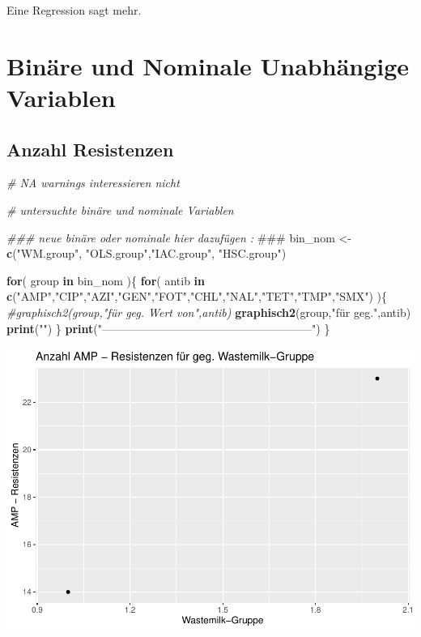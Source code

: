 \documentclass[
]{article}
\newenvironment{Shaded}{\begin{snugshade}}{\end{snugshade}}
\newcommand{\AlertTok}[1]{\textcolor[rgb]{0.94,0.16,0.16}{#1}}
\newcommand{\CommentTok}[1]{\textcolor[rgb]{0.56,0.35,0.01}{\textit{#1}}}
\newcommand{\ControlFlowTok}[1]{\textcolor[rgb]{0.13,0.29,0.53}{\textbf{#1}}}
\newcommand{\KeywordTok}[1]{\textcolor[rgb]{0.13,0.29,0.53}{\textbf{#1}}}
\newcommand{\NormalTok}[1]{#1}
\newcommand{\StringTok}[1]{\textcolor[rgb]{0.31,0.60,0.02}{#1}}
\begin{document}
Eine Regression sagt mehr.

\hypertarget{binuxe4re-und-nominale-unabhuxe4ngige-variablen}{%
\section{Binäre und Nominale Unabhängige
Variablen}\label{binuxe4re-und-nominale-unabhuxe4ngige-variablen}}

\hypertarget{anzahl-resistenzen}{%
\subsection{Anzahl Resistenzen}\label{anzahl-resistenzen}}

\begin{Shaded}
\begin{Highlighting}[]
\CommentTok{# NA warnings interessieren nicht}

\CommentTok{# untersuchte binäre und nominale Variablen }

\CommentTok{### neue binäre oder nominale hier dazufügen : }\AlertTok{###}
\NormalTok{bin_nom <-}\StringTok{ }\KeywordTok{c}\NormalTok{(}\StringTok{"WM.group"}\NormalTok{, }\StringTok{"OLS.group"}\NormalTok{,}\StringTok{"IAC.group"}\NormalTok{,   }\StringTok{"HSC.group"}\NormalTok{)       }

\ControlFlowTok{for}\NormalTok{( group }\ControlFlowTok{in}\NormalTok{ bin_nom )\{}
  \ControlFlowTok{for}\NormalTok{( antib }\ControlFlowTok{in} \KeywordTok{c}\NormalTok{(}\StringTok{"AMP"}\NormalTok{,}\StringTok{"CIP"}\NormalTok{,}\StringTok{"AZI"}\NormalTok{,}\StringTok{"GEN"}\NormalTok{,}\StringTok{"FOT"}\NormalTok{,}\StringTok{"CHL"}\NormalTok{,}\StringTok{"NAL"}\NormalTok{,}\StringTok{"TET"}\NormalTok{,}\StringTok{"TMP"}\NormalTok{,}\StringTok{"SMX"}\NormalTok{) )\{}
    \CommentTok{#graphisch2(group,"für geg. Wert von",antib)  }
    \KeywordTok{graphisch2}\NormalTok{(group,}\StringTok{"für geg."}\NormalTok{,antib)  }
    \KeywordTok{print}\NormalTok{(}\StringTok{""}\NormalTok{)}
\NormalTok{  \} }
  \KeywordTok{print}\NormalTok{(}\StringTok{"--------------------------------------------------------"}\NormalTok{)}
\NormalTok{\}}
\end{Highlighting}
\end{Shaded}

\includegraphics{NResistenzen_files/figure-latex/unnamed-chunk-7-1.pdf}
\end{document}

